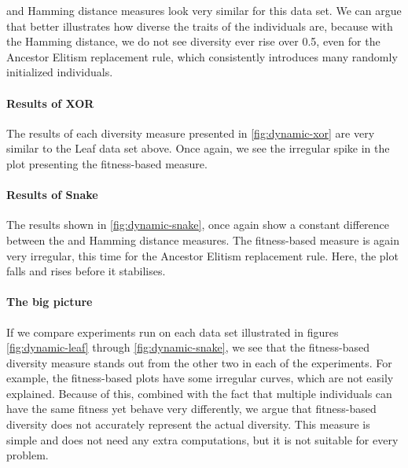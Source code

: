 \dia{} and Hamming distance measures look very similar for this data set. We can argue that \dia{} better illustrates how diverse the traits of the individuals are, because with the Hamming distance, we do not see diversity ever rise over \num{0.5}, even for the Ancestor Elitism replacement rule, which consistently introduces many randomly initialized individuals. 



\paragraph{Results of XOR} The results of each diversity measure presented in \cref{fig:dynamic-xor} are very similar to the Leaf data set above. Once again, we see the irregular spike in the plot presenting the fitness-based measure. %



\paragraph{Results of Snake} The results shown in \cref{fig:dynamic-snake}, once again show a constant difference between the \dia{} and Hamming distance measures. The fitness-based measure is again very irregular, this time for the Ancestor Elitism replacement rule. Here, the plot falls and rises before it stabilises.



\paragraph{The big picture} If we compare experiments run on each data set illustrated in figures \ref{fig:dynamic-leaf} through \ref{fig:dynamic-snake}, we see that the fitness-based diversity measure stands out from the other two in each of the experiments. For example, the fitness-based plots have some irregular curves, which are not easily explained. Because of this, combined with the fact that multiple individuals can have the same fitness yet behave very differently, we argue that fitness-based diversity does not accurately represent the actual diversity. This measure is simple and does not need any extra computations, but it is not suitable for every problem. 

